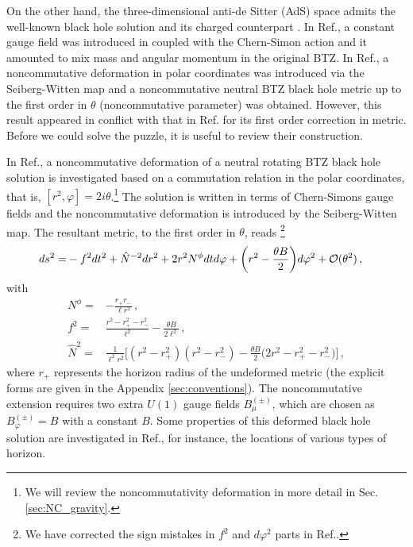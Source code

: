 \documentclass[11pt]{article}
\newcommand{\vap}{\varphi}
\numberwithin{equation}{section}
\begin{document}
On the other hand, the three-dimensional anti-de Sitter (AdS) space admits the well-known black hole solution \cite{Banados:1992wn} and its charged counterpart \cite{Clement,Martinez:1999qi}.  In Ref.\cite{Banados:2001xw}, a constant gauge field was introduced in coupled with the Chern-Simon action and it amounted to mix mass and angular momentum in the original BTZ.  In Ref.\cite{ChangYoung:2008my}, a noncommutative
deformation in polar coordinates was introduced via the Seiberg-Witten
map and a noncommutative neutral BTZ black hole metric up to the first
order in  $\theta$ (noncommutative parameter) was obtained.  However,
this result appeared in conflict with that in Ref.\cite{Mukherjee:2006nd, Banerjee:2007th}
for its first order correction in metric.  Before we could solve the puzzle, 
it is useful to review their construction.




In Ref.\cite{ChangYoung:2008my}, a noncommutative deformation of a neutral rotating BTZ black
hole solution is investigated based on
a commutation relation in the polar coordinates, that is, 
$[r^2,\vap]=2i\theta$.\footnote{%
We will review the noncommutativity deformation in more detail in
Sec.\ref{sec:NC_gravity}.}
The solution is written in terms of Chern-Simons gauge fields and the noncommutative
deformation is introduced by the Seiberg-Witten map.
The resultant metric, to the first order in $\theta$, reads \footnote{%
We have corrected the sign mistakes in $f^2$
and $d\vap^2$ parts in Ref.\cite{ChangYoung:2008my}.}
\begin{align}
  ds^2 =&
-f^2 dt^2 + \hat{N}^{-2} dr^2
+2r^2 N^\phi dt d\varphi
+\bigg( r^2 - \frac{\theta B}{2} \bigg) d\varphi^2
+{\cal O}(\theta^2)
 \,,
\label{eq:neutral_def_BTZ}
\end{align}
with
\begin{align}
  N^\phi=& -\frac{r_+r_-}{\ell r^2} \,,\\
f^2 =& 
\frac{r^2 -r_+^2 -r_-^2}{\ell^2}  - \frac{\theta B}{2 \ell^2} \,,\\
\hat{N}^2 =&
\frac{1}{\ell^2 r^2}
\bigg[(r^2-r_+^2)(r^2-r_-^2) - \frac{\theta B}{2} \big( 2r^2-r_+^2-r_-^2\big) \bigg]
\,,
\end{align}
where $r_+$ represents the horizon radius of the undeformed metric
(the explicit forms are given in the Appendix \ref{sec:conventions}).
The noncommutative extension requires two extra $U(1)$ gauge fields
$B_\mu^{(\pm)}$, which are chosen as $B_\vap^{(\pm)}=B$ with a constant $B$.
Some properties of this deformed black hole solution are investigated 
in Ref.\cite{ChangYoung:2008my}, for instance, the locations of various types of horizon.
\end{document}

